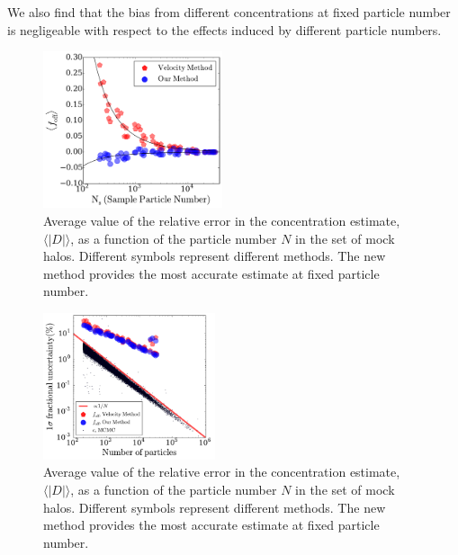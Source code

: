 \documentclass[a4,useAMS,usenatbib,usegraphicx]{mn2e}
\newcommand{\avg}[1]{\langle{#1}\rangle}
\begin{document}
We also find that the bias from different concentrations at fixed
particle number is negligeable with respect to the effects induced by
different particle numbers. 

\begin{figure}
\begin{center}
  \includegraphics[width=0.47\textwidth]{avg_foff_bolshoi.pdf}
\end{center}
\vspace{-0.5cm}
\caption{Average value of the relative error in the concentration
  estimate, $\avg{|D|}$, as a function of the particle number $N$ in
  the set of mock halos. Different symbols represent different
  methods. The new method provides the most accurate estimate at fixed
  particle number.  
    \label{fig:downsampling}}
\end{figure}

\begin{figure}
\begin{center}
  \includegraphics[width=0.45\textwidth]{error_conc_bolshoi.pdf}
\end{center}
\vspace{-0.5cm}
\caption{Average value of the relative error in the concentration
  estimate, $\avg{|D|}$, as a function of the particle number $N$ in
  the set of mock halos. Different symbols represent different
  methods. The new method provides the most accurate estimate at fixed
  particle number.  
    \label{fig:downsampling}}
\end{figure}
\end{document}
